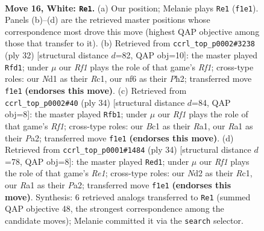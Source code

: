 \documentclass[11pt]{article}
\begin{document}
\clearpage

\begin{figure}[p]\centering
\begin{subfigure}{0.46\textwidth}\centering
\resizebox{\linewidth}{!}{%
\newchessgame
\chessboard[
  setfen={1nb2rk1/r5b1/1p2pn2/p1p2ppp/2P5/1P4P1/P2NPPBP/R1BN1RK1 w - - 0 16},
  showmover=false,
  pgfstyle=straightmove, color=movearrow, markmove={f1-e1}
]}
\caption{}
\end{subfigure}\hfill
\begin{subfigure}{0.46\textwidth}\centering
\resizebox{\linewidth}{!}{%
\newchessgame
\chessboard[
  setfen={r1b2rk1/1p1n1pb1/2p1p1pp/4P3/p1BPN3/5N2/PP3PPP/2R2RK1 w - - 0 17},
  showmover=false,
  pgfstyle=straightmove, color=movearrow, markmove={f1-d1}
]}
\caption{}
\end{subfigure}
\\[4pt]
\begin{subfigure}{0.46\textwidth}\centering
\resizebox{\linewidth}{!}{%
\newchessgame
\chessboard[
  setfen={r1b1r1k1/pp2npp1/7p/3p4/2pP4/2P1PN2/P1B2PPP/R4RK1 w - - 1 18},
  showmover=false,
  pgfstyle=straightmove, color=movearrow, markmove={f1-b1}
]}
\caption{}
\end{subfigure}\hfill
\begin{subfigure}{0.46\textwidth}\centering
\resizebox{\linewidth}{!}{%
\newchessgame
\chessboard[
  setfen={r4rk1/pp2ppbp/2pp1n2/B4p2/2PP4/1P3NP1/P3PP1P/2R1R1K1 w - - 1 18},
  showmover=false,
  pgfstyle=straightmove, color=movearrow, markmove={e1-d1}
]}
\caption{}
\end{subfigure}
\caption{\textbf{Move 16, White: \texttt{Re1}.} (a) Our position; Melanie plays \texttt{Re1} (\texttt{f1e1}). Panels (b)--(d) are the retrieved master positions whose correspondence most drove this move (highest QAP objective among those that transfer to it). (b) Retrieved from \texttt{ccrl\_top\_p0002\#3238} (ply 32) [structural distance $d$=82, QAP obj=10]: the master played \texttt{Rfd1}; under $\mu$ our \emph{Rf1} plays the role of that game's \emph{Rf1}; cross-type roles: our \emph{N}d1 as their \emph{R}c1, our \emph{n}f6 as their \emph{P}h2; transferred move \texttt{f1e1} \textbf{(endorses this move)}. (c) Retrieved from \texttt{ccrl\_top\_p0002\#40} (ply 34) [structural distance $d$=84, QAP obj=8]: the master played \texttt{Rfb1}; under $\mu$ our \emph{Rf1} plays the role of that game's \emph{Rf1}; cross-type roles: our \emph{B}c1 as their \emph{R}a1, our \emph{R}a1 as their \emph{P}a2; transferred move \texttt{f1e1} \textbf{(endorses this move)}. (d) Retrieved from \texttt{ccrl\_top\_p0001\#1484} (ply 34) [structural distance $d$=78, QAP obj=8]: the master played \texttt{Red1}; under $\mu$ our \emph{Rf1} plays the role of that game's \emph{Re1}; cross-type roles: our \emph{N}d2 as their \emph{R}c1, our \emph{R}a1 as their \emph{P}a2; transferred move \texttt{f1e1} \textbf{(endorses this move)}. Synthesis: 6 retrieved analogs transferred to \texttt{Re1} (summed QAP objective 48, the strongest correspondence among the candidate moves); Melanie committed it via the \texttt{search} selector.}
\label{fig:thought-m30}
\end{figure}
\end{document}
